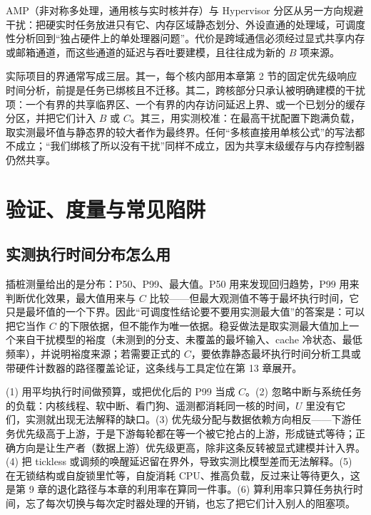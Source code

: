 \documentclass[12pt,a4paper,fontset=fandol]{ctexbook}
\begin{document}
AMP（非对称多处理，通用核与实时核并存）与 Hypervisor 分区从另一方向规避干扰：把硬实时任务放进只有它、内存区域静态划分、外设直通的处理域，可调度性分析回到“独占硬件上的单处理器问题”。代价是跨域通信必须经过显式共享内存或邮箱通道，而这些通道的延迟与吞吐要建模，且往往成为新的 $B$ 项来源。

\begin{guideline}[title={多核响应时间界怎么写才站得住}]
实际项目的界通常写成三层。其一，每个核内部用本章第 2 节的固定优先级响应时间分析，前提是任务已绑核且不迁移。其二，跨核部分只承认被明确建模的干扰项：一个有界的共享临界区、一个有界的内存访问延迟上界、或一个已划分的缓存分区，并把它们计入 $B$ 或 $C$。其三，用实测校准：在最高干扰配置下跑满负载，取实测最坏值与静态界的较大者作为最终界。任何“多核直接用单核公式”的写法都不成立；“我们绑核了所以没有干扰”同样不成立，因为共享末级缓存与内存控制器仍然共享。
\end{guideline}

\section{验证、度量与常见陷阱}

\subsection*{实测执行时间分布怎么用}

插桩测量给出的是分布：P50、P99、最大值。P50 用来发现回归趋势，P99 用来判断优化效果，最大值用来与 $C$ 比较——但最大观测值不等于最坏执行时间，它只是最坏值的一个下界。因此“可调度性结论要不要用实测最大值”的答案是：可以把它当作 $C$ 的下限依据，但不能作为唯一依据。稳妥做法是取实测最大值加上一个来自干扰模型的裕度（未测到的分支、未覆盖的最坏输入、cache 冷状态、最低频率），并说明裕度来源；若需要正式的 $C$，要依靠静态最坏执行时间分析工具或带硬件计数器的路径覆盖论证，这条线与工具定位在第 13 章展开。

\begin{warning}[title={六个反复出现的分析错误}]
(1) 用平均执行时间做预算，或把优化后的 P99 当成 $C$。(2) 忽略中断与系统任务的负载：内核线程、软中断、看门狗、遥测都消耗同一核的时间，$U$ 里没有它们，实测就出现无法解释的缺口。(3) 优先级分配与数据依赖方向相反——下游任务优先级高于上游，于是下游每轮都在等一个被它抢占的上游，形成链式等待；正确方向是让生产者（数据上游）优先级更高，除非这条反转被显式建模并计入界。(4) 把 tickless 或调频的唤醒延迟留在界外，导致实测比模型差而无法解释。(5) 在无锁结构或自旋锁里忙等，自旋消耗 CPU、推高负载，反过来让等待更久，这是第 9 章的退化路径与本章的利用率在算同一件事。(6) 算利用率只算任务执行时间，忘了每次切换与每次定时器处理的开销，也忘了把它们计入别人的阻塞项。
\end{warning}
\end{document}
